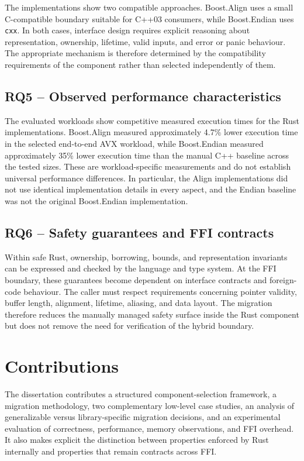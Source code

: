 The implementations show two compatible approaches. Boost.Align uses a small C-compatible boundary suitable for C++03 consumers, while Boost.Endian uses \texttt{cxx}. In both cases, interface design requires explicit reasoning about representation, ownership, lifetime, valid inputs, and error or panic behaviour. The appropriate mechanism is therefore determined by the compatibility requirements of the component rather than selected independently of them.

\subsection{RQ5 -- Observed performance characteristics}

The evaluated workloads show competitive measured execution times for the Rust implementations. Boost.Align measured approximately 4.7\% lower execution time in the selected end-to-end AVX workload, while Boost.Endian measured approximately 35\% lower execution time than the manual C++ baseline across the tested sizes. These are workload-specific measurements and do not establish universal performance differences. In particular, the Align implementations did not use identical implementation details in every aspect, and the Endian baseline was not the original Boost.Endian implementation.

\subsection{RQ6 -- Safety guarantees and FFI contracts}

Within safe Rust, ownership, borrowing, bounds, and representation invariants can be expressed and checked by the language and type system. At the FFI boundary, these guarantees become dependent on interface contracts and foreign-code behaviour. The caller must respect requirements concerning pointer validity, buffer length, alignment, lifetime, aliasing, and data layout. The migration therefore reduces the manually managed safety surface inside the Rust component but does not remove the need for verification of the hybrid boundary.

\section{Contributions}
\label{sec:contributions}

The dissertation contributes a structured component-selection framework, a migration methodology, two complementary low-level case studies, an analysis of generalizable versus library-specific migration decisions, and an experimental evaluation of correctness, performance, memory observations, and FFI overhead. It also makes explicit the distinction between properties enforced by Rust internally and properties that remain contracts across FFI.


